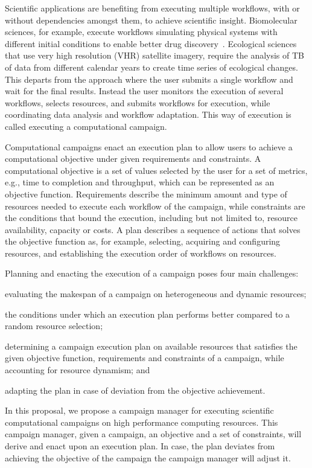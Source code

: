 Scientific applications are benefiting from executing multiple workflows, with or without dependencies amongst them, to achieve scientific insight.
Biomolecular sciences, for example, execute workflows simulating physical systems with different initial conditions to enable better drug discovery~\cite{dakka2018concurrent}.
Ecological sciences that use very high resolution (VHR) satellite imagery, require the analysis of TB of data from different calendar years to create time series of ecological changes.
This departs from the approach where the user submits a single workflow and wait for the final results.
Instead the user monitors the execution of several workflows, selects resources, and submits workflows for execution, while coordinating data analysis and workflow adaptation.
This way of execution is called executing a computational campaign.

Computational campaigns enact an execution plan to allow users to achieve a computational objective under given requirements and constraints.
A computational objective is a set of values selected by the user for a set of metrics, e.g., time to completion and throughput, which can be represented as an objective function.
Requirements describe the minimum amount and type of resources needed to execute each workflow of the campaign, while constraints are the conditions that bound the execution, including but not limited to, resource availability, capacity or costs.
A plan describes a sequence of actions that solves the objective function as, for example, selecting, acquiring and configuring resources, and establishing the execution order of workflows on resources.


Planning and enacting the execution of a campaign poses four main challenges: 
\begin{inparaenum}[(i)]
\item evaluating the makespan of a campaign on heterogeneous and dynamic resources;
\item the conditions under which an execution plan performs better compared to a random resource selection;
\item determining a campaign execution plan on available resources that satisfies the given objective function, requirements and constraints of a campaign, while accounting for resource dynamism; and
\item adapting the plan in case of deviation from the objective achievement.
\end{inparaenum}

In this proposal, we propose a campaign manager for executing scientific computational campaigns on high performance computing resources.
This campaign manager, given a campaign, an objective and a set of constraints, will derive and enact upon an execution plan. 
In case, the plan deviates from achieving the objective of the campaign the campaign manager will adjust it.

